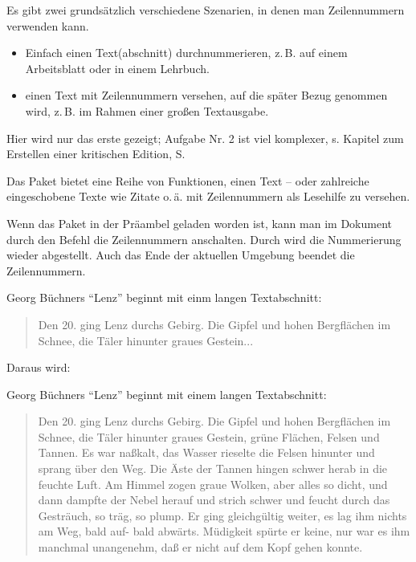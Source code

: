 Es gibt zwei grundsätzlich verschiedene Szenarien, in denen man Zeilennummern verwenden
kann. 

\begin{itemize}
 \item Einfach einen Text(abschnitt) durchnummerieren, z.\,B. auf einem Arbeitsblatt oder in
 einem Lehrbuch.
 \item einen Text mit Zeilennummern versehen, auf die später Bezug genommen wird, 
 z.\,B. im Rahmen einer großen Textausgabe. 
\end{itemize}

Hier wird nur das erste gezeigt;
Aufgabe Nr. 2 ist viel komplexer, s. Kapitel zum Erstellen einer kritischen Edition, 
S.~\pageref{reledmac} 

Das Paket  bietet eine Reihe von Funktionen, einen Text -- oder 
zahlreiche eingeschobene Texte wie Zitate o.\,ä. mit Zeilennummern als Lesehilfe zu 
versehen.



Wenn das Paket  in der Präambel geladen worden ist, kann man im
Dokument durch den Befehl  die Zeilennummern anschalten.
Durch  wird die Nummerierung wieder abgestellt.
Auch das Ende der aktuellen Umgebung beendet die Zeilennummern.

\begin{lfgwcode}{}
 Georg Büchners \enquote{Lenz} beginnt mit einm langen Textabschnitt:
 
 \begin{quotation}
 \modulolinenumbers[5]
 \linenumbers
 Den 20. ging Lenz durchs Gebirg. Die Gipfel und hohen Bergflächen im Schnee, die Täler
 hinunter graues Gestein...
 \end{quotation}
\end{lfgwcode}

Daraus wird:
\bigskip

 Georg Büchners \enquote{Lenz} beginnt mit einem langen Textabschnitt:

 \begin{quotation}
 \modulolinenumbers[5]
 \linenumbers
 Den 20. ging Lenz durchs Gebirg. Die Gipfel und hohen Bergflächen im Schnee, die Täler
 hinunter graues Gestein, grüne Flächen, Felsen und Tannen. Es war naßkalt, das Wasser
 rieselte die Felsen hinunter und sprang über den Weg. Die Äste der Tannen hingen schwer
 herab in die feuchte Luft. Am Himmel zogen graue Wolken, aber alles so dicht, und dann 
 dampfte der Nebel herauf und strich schwer und feucht durch das Gesträuch, so träg,
 so plump. Er ging gleichgültig weiter, es lag ihm nichts am Weg, bald auf- bald
 abwärts. Müdigkeit spürte er keine, nur war es ihm manchmal unangenehm, daß er nicht
 auf dem Kopf gehen konnte.
 \end{quotation}

